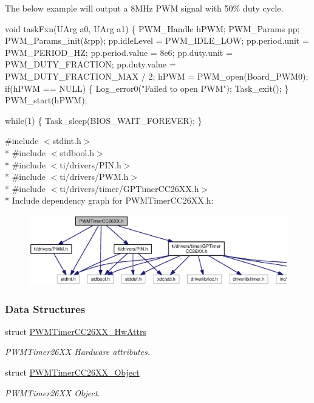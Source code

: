 The below example will output a 8\+M\+Hz P\+W\+M signal with 50\% duty cycle. 
\begin{DoxyCode}
\textcolor{keywordtype}{void} taskFxn(UArg a0, UArg a1) \{
  PWM_Handle hPWM;
  PWM_Params pp;
  PWM_Params_init(&pp);
  pp.idleLevel      = PWM_IDLE_LOW;
  pp.period.unit    = PWM_PERIOD_HZ;
  pp.period.value   = 8e6;
  pp.duty.unit      = PWM_DUTY_FRACTION;
  pp.duty.value     = PWM_DUTY_FRACTION_MAX / 2;
  hPWM = PWM_open(Board\_PWM0);
  \textcolor{keywordflow}{if}(hPWM == NULL) \{
    Log\_error0(\textcolor{stringliteral}{"Failed to open PWM"});
    Task\_exit();
  \}
  PWM_start(hPWM);

  \textcolor{keywordflow}{while}(1) \{
    Task\_sleep(BIOS\_WAIT\_FOREVER);
  \}
\end{DoxyCode}
 {\ttfamily \#include $<$stdint.\+h$>$}\\*
{\ttfamily \#include $<$stdbool.\+h$>$}\\*
{\ttfamily \#include $<$ti/drivers/\+P\+I\+N.\+h$>$}\\*
{\ttfamily \#include $<$ti/drivers/\+P\+W\+M.\+h$>$}\\*
{\ttfamily \#include $<$ti/drivers/timer/\+G\+P\+Timer\+C\+C26\+X\+X.\+h$>$}\\*
Include dependency graph for P\+W\+M\+Timer\+C\+C26\+X\+X.\+h\+:
\nopagebreak
\begin{figure}[H]
\begin{center}
\leavevmode
\includegraphics[width=350pt]{_p_w_m_timer_c_c26_x_x_8h__incl}
\end{center}
\end{figure}
\subsubsection*{Data Structures}
\begin{DoxyCompactItemize}
\item 
struct \hyperlink{struct_p_w_m_timer_c_c26_x_x___hw_attrs}{P\+W\+M\+Timer\+C\+C26\+X\+X\+\_\+\+Hw\+Attrs}
\begin{DoxyCompactList}\small\item\em P\+W\+M\+Timer26\+X\+X Hardware attributes. \end{DoxyCompactList}\item 
struct \hyperlink{struct_p_w_m_timer_c_c26_x_x___object}{P\+W\+M\+Timer\+C\+C26\+X\+X\+\_\+\+Object}
\begin{DoxyCompactList}\small\item\em P\+W\+M\+Timer26\+X\+X Object. \end{DoxyCompactList}\end{DoxyCompactItemize}
